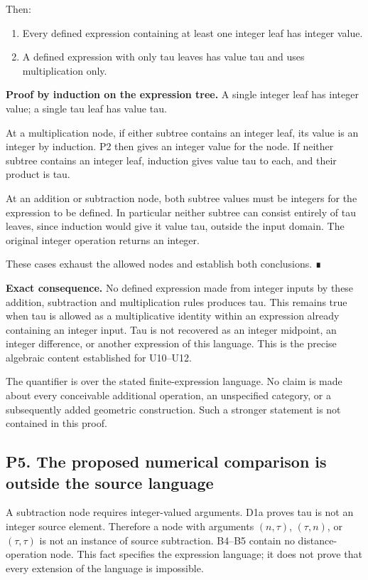 Then:

\begin{enumerate}
\def\labelenumi{\arabic{enumi}.}

\item
  Every defined expression containing at least one integer leaf has
  integer value.
\item
  A defined expression with only tau leaves has value tau and uses
  multiplication only.
\end{enumerate}

\textbf{Proof by induction on the expression tree.} A single integer
leaf has integer value; a single tau leaf has value tau.

At a multiplication node, if either subtree contains an integer leaf,
its value is an integer by induction. P2 then gives an integer value for
the node. If neither subtree contains an integer leaf, induction gives
value tau to each, and their product is tau.

At an addition or subtraction node, both subtree values must be integers
for the expression to be defined. In particular neither subtree can
consist entirely of tau leaves, since induction would give it value tau,
outside the input domain. The original integer operation returns an
integer.

These cases exhaust the allowed nodes and establish both conclusions. ∎

\textbf{Exact consequence.} No defined expression made from integer
inputs by these addition, subtraction and multiplication rules produces
tau. This remains true when tau is allowed as a multiplicative identity
within an expression already containing an integer input. Tau is not
recovered as an integer midpoint, an integer difference, or another
expression of this language. This is the precise algebraic content
established for U10--U12.

The quantifier is over the stated finite-expression language. No claim
is made about every conceivable additional operation, an unspecified
category, or a subsequently added geometric construction. Such a
stronger statement is not contained in this proof.

\subsection{P5. The proposed numerical comparison is outside the source
language}\label{uad-p5.-the-proposed-numerical-comparison-is-outside-the-source-language}

A subtraction node requires integer-valued arguments. D1a proves tau is
not an integer source element. Therefore a node with arguments
\((n,\tau)\), \((\tau,n)\), or \((\tau,\tau)\) is not an instance of
source subtraction. B4--B5 contain no distance-operation node. This fact
specifies the expression language; it does not prove that every
extension of the language is impossible.

